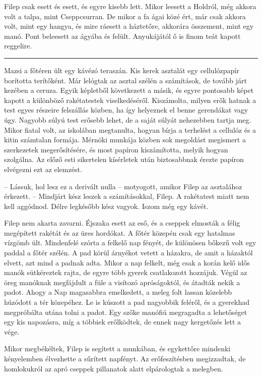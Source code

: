 \documentclass[10pt]{memoir}
\renewcommand{\pfbreakdisplay}{\bigskip \ding{166} \bigskip}
\newcommand{\secbreak}{\fancybreak{\pfbreakdisplay}\indent}
\begin{document}
Filep csak esett és esett, és egyre kisebb lett. Mikor leesett a Holdról, még
akkora volt a talpa, mint Cseppcsurran. De mikor a fa ágai közé ért, már csak
akkora volt, mint egy hangya, és mire ráesett a háztetőre, akkorára összement,
mint egy manó. Pont beleesett az ágyába és felült. Anyukájától ő is finom teát
kapott reggelire.

\secbreak

Mazsi a főtéren ült egy kávézó teraszán. Kis kerek asztalát egy cellulózpapír
borította terítőként. Már lelógtak az asztal szélén a számítások, de tovább
járt kezében a ceruza. Egyik képletből következett a másik, és egyre pontosabb
képet kapott a különböző rakétatestek viselkedéséről. Kiszámolta, milyen erők
hatnak a test egyes részeire felszállás közben, ha így helyeznek el benne
gerendákat vagy úgy. Nagyobb súlyú test erősebb lehet, de a saját súlyát
nehezebben tartja meg. Mikor fiatal volt, az iskolában megtanulta, hogyan bírja
a terhelést a cellulóz és a kitin számtalan formája. Mérnöki munkája közben sok
megoldást megismert a szerkezetek megerősítésére, és most papíron kiszámította,
melyik hogyan szolgálna. Az előző esti sikertelen kísérletek után biztosabbnak
érezte papíron elvégezni ezt az elemzést.

-- Lássuk, hol lesz ez a derivált nulla -- motyogott, amikor Filep az
asztalához érkezett. -- Mindjárt kész leszek a számításokkal, Filep. A
rakétatest miatt nem kell aggódnod. Délre legkésőbb kész vagyok. Iszom még egy
kávét.

Filep nem akarta zavarni. Éjszaka esett az eső, és a cseppek elmosták a félig
megépített rakétát és az üres hordókat. A főtér közepén csak egy hatalmas
vízgömb ült. Mindenfelé szórta a felkelő nap fényét, de különösen bőkezű volt
egy paddal a főtér szélén. A pad körül árnyékot vetett a házakra, de amit a
házaktól elvett, azt mind a padnak adta. Mikor a nap felkelt, még csak a korán
kelő idős manók sütkéreztek rajta, de egyre több gyerek csatlakozott hozzájuk.
Végül az öreg manóknak megfájdult a füle a visítozó apróságoktól, és átadták
nekik a padot. Ahogy a Nap magasabbra emelkedett, a meleg folt lassan közelebb
húzódott a tér közepéhez. Le is kúszott a pad nagyobbik feléről, és a gyerekhad
megpróbálta utána tolni a padot. Egy szőke manófiú megragadta a lehetőséget egy
kis napozásra, míg a többiek erőlködtek, de ennek nagy kergetőzés lett a vége.

Mikor megbékéltek, Filep is segített a munkában, és egykettőre mindenki
kényelemben élvezhette a sűrített napfényt. Az erőfeszítésben megizzadtak, de
homlokukról az apró cseppek pillanatok alatt elpárologtak a melegben.
\end{document}

